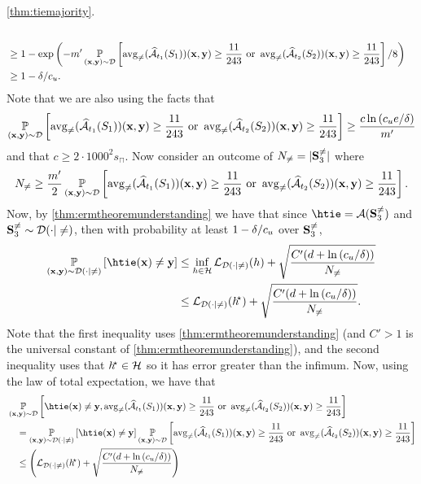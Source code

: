 \begin{proofof}{\cref{thm:tiemajority}.}
\begin{align*}
 \\
&  \geq 1- \exp{\left(-m'\operatorname*{\mathbb{P}}_{(\mathbf{x},\mathbf{y})\sim\mathcal{D}}\left[\operatorname{\mathrm{avg}_{\not=}}(\widehat{\mathcal{A}}_{t_{1}}(S_{1}))(\mathbf{x},\mathbf{y})\geq \frac{11}{243} \text{ or } \operatorname{\mathrm{avg}_{\not=}}(\widehat{\mathcal{A}}_{t_{2}}(S_{2}))(\mathbf{x},\mathbf{y})\geq \frac{11}{243}\right]/8 \right)} \\
&\geq 1-\delta/c_{u}.  
\end{align*}   
Note that we are also using the facts that 
\[ \operatorname*{\mathbb{P}}_{(\mathbf{x},\mathbf{y})\sim\mathcal{D}}\left[\operatorname{\mathrm{avg}_{\not=}}(\widehat{\mathcal{A}}_{t_{1}}(S_{1}))(\mathbf{x},\mathbf{y})\geq \frac{11}{243} \text{ or } \operatorname{\mathrm{avg}_{\not=}}(\widehat{\mathcal{A}}_{t_{2}}(S_{2}))(\mathbf{x},\mathbf{y})\geq \frac{11}{243}\right] \geq \frac{c\ln{\left(c_{u}e/\delta \right)}}{m'} \]
and that $ c\geq 2\cdot1000^{2} s_{\sqcap}$.   
Now consider an outcome of $ N_{\not=}=|\mathbf{S}_{3}^{\not=}| $ where 
\[ N_{\not=} \geq \frac{m'}{2} \operatorname*{\mathbb{P}}_{(\mathbf{x},\mathbf{y})\sim\mathcal{D}}\left[\operatorname{\mathrm{avg}_{\not=}}(\widehat{\mathcal{A}}_{t_{1}}(S_{1}))(\mathbf{x},\mathbf{y})\geq \frac{11}{243} \text{ or } \operatorname{\mathrm{avg}_{\not=}}(\widehat{\mathcal{A}}_{t_{2}}(S_{2}))(\mathbf{x},\mathbf{y})\geq \frac{11}{243}\right]. \] 
Now, by \cref{thm:ermtheoremunderstanding} we have that since $ \htie=\cA(\rS_{3}^{\not=})$ and $ \mathbf{S}_{3}^{\not=}\sim \mathcal{D}(\cdot | \not=) $, then with probability at least $ 1-\delta/c_{u} $ over $ \mathbf{S}_{3}^{\not=} $,
\begin{align*}
\p_{(\rx,\ry)\sim\cD(\cdot|\not=)}\left[ \htie(\rx)\not=\ry\right] &\leq \inf_{h\in\cH}\ls_{\cD(\cdot|\not=)}(h)+\sqrt{\frac{C'(d+\ln{\left(\cu/\delta \right)})}{N_{\not=}}} \\
& \leq \ls_{\cD(\cdot|\not=)}(\hs)+\sqrt{\frac{C'(d+\ln{\left(\cu/\delta \right)})}{N_{\not=}}}.   
\end{align*}
Note that the first inequality uses \cref{thm:ermtheoremunderstanding} (and $ C'>1 $  is the universal constant of \cref{thm:ermtheoremunderstanding}), and the second inequality uses that $ h^{\negmedspace\star}\in \mathcal{H} $ so it has error greater than the infimum. 
Now, using the law of total expectation, we have that  
\begin{align*}
& \p_{(\rx,\ry)\sim\cD}\left[ \htie(\rx)\not=\ry,\avg(\widehat{\cA}_{t_{1}}(S_{1}))(\rx,\ry)\geq \frac{11}{243} \text{ or } \avg(\widehat{\cA}_{t_{2}}(S_{2}))(\rx,\ry)\geq \frac{11}{243}\right]\\
& \quad = \p_{(\rx,\ry)\sim\cD(\cdot|\not=)}\left[ \htie(\rx)\not=\ry\right]\p_{(\rx,\ry)\sim\cD}\left[\avg(\widehat{\cA}_{t_{1}}(S_{1}))(\rx,\ry)\geq \frac{11}{243} \text{ or } \avg(\widehat{\cA}_{t_{2}}(S_{2}))(\rx,\ry)\geq \frac{11}{243}\right]
    \\
& \quad \leq \left(\ls_{\cD(\cdot|\not=)}(\hs)+\sqrt{\frac{C'(d+\ln{\left(\cu/\delta \right)})}{N_{\not=}}}\right)   \\

\end{align*}
\end{proofof}
